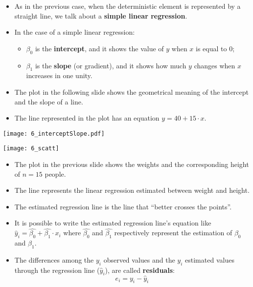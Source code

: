 \begin{frame}
  \begin{itemize}
    \item As in the previous case, when the deterministic element is represented by a straight line, we talk about a \textbf{simple linear regression}. 
    \vspace{0.2cm}
    \item In the case of a simple linear regression:
    \begin{itemize}
      \item $ \beta_0 $ is the \textbf{intercept}, and it shows the value of $ y $ when $ x $ is equal to $ 0 $;
      \item $ \beta_1 $ is the \textbf{slope} (or gradient), and it shows how much $ y $ changes when $ x $ increases in one unity.
    \end{itemize}
    \vspace{0.2cm}
    \item The plot in the following slide shows the geometrical meaning of the intercept and the slope of a line.
    \vspace{0.2cm}
    \item The line represented in the plot has an equation $ y = 40 + 15 \cdot x $.
  \end{itemize}
\end{frame}

\begin{frame}
  \begin{center}
    \texttt{[image: 6\_interceptSlope.pdf]}
  \end{center}
\end{frame}

\begin{frame}
  \begin{center}
    \texttt{[image: 6\_scatt]}
  \end{center}
\end{frame}

\begin{frame}
  \begin{itemize}
    \item The plot in the previous slide shows the weights and the corresponding height of $ n = 15 $ people. 
    \item The line represents the linear regression estimated between weight and height.
    \item The estimated regression line is the line that ``better crosses the points''.
    \item It is possible to write the estimated regression line's equation like $ \hat{y}_i = \hat{\beta_0} + \hat{\beta_1} \cdot x_i $ where $ \hat{\beta_0} $ and $ \hat{\beta_1} $ respectively represent the estimation of $ \beta_0 $ and $ \beta_1 $.
    \item The differences among the $ y_i $ observed values and the $ y_i $ estimated values through the regression line ($ \hat{y}_i $), are called \textbf{residuals}: \vspace{-0.5cm} $$ e_i = y_i - \hat{y}_i $$
  \end{itemize}
\end{frame}
    
